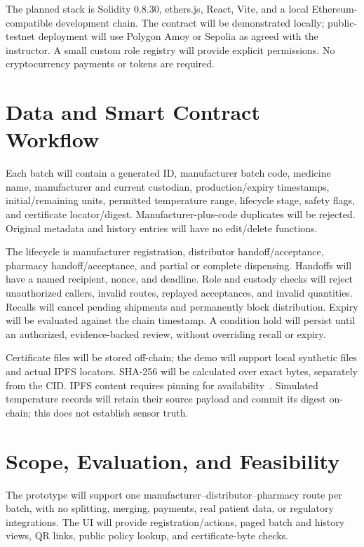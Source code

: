 \documentclass[10pt,twocolumn,letterpaper]{article}
\begin{document}
The planned stack is Solidity 0.8.30, ethers.js, React, Vite, and a local Ethereum-compatible development chain. The contract will be demonstrated locally; public-testnet deployment will use Polygon Amoy or Sepolia as agreed with the instructor. A small custom role registry will provide explicit permissions. No cryptocurrency payments or tokens are required.

\section{Data and Smart Contract Workflow}
Each batch will contain a generated ID, manufacturer batch code, medicine name, manufacturer and current custodian, production/expiry timestamps, initial/remaining units, permitted temperature range, lifecycle stage, safety flags, and certificate locator/digest. Manufacturer-plus-code duplicates will be rejected. Original metadata and history entries will have no edit/delete functions.

The lifecycle is manufacturer registration, distributor handoff/acceptance, pharmacy handoff/acceptance, and partial or complete dispensing. Handoffs will have a named recipient, nonce, and deadline. Role and custody checks will reject unauthorized callers, invalid routes, replayed acceptances, and invalid quantities. Recalls will cancel pending shipments and permanently block distribution. Expiry will be evaluated against the chain timestamp. A condition hold will persist until an authorized, evidence-backed review, without overriding recall or expiry.

Certificate files will be stored off-chain; the demo will support local synthetic files and actual IPFS locators. SHA-256 will be calculated over exact bytes, separately from the CID. IPFS content requires pinning for availability~\cite{ipfs}. Simulated temperature records will retain their source payload and commit its digest on-chain; this does not establish sensor truth.

\balance
\section{Scope, Evaluation, and Feasibility}
The prototype will support one manufacturer--distributor--pharmacy route per batch, with no splitting, merging, payments, real patient data, or regulatory integrations. The UI will provide registration/actions, paged batch and history views, QR links, public policy lookup, and certificate-byte checks.
\end{document}

